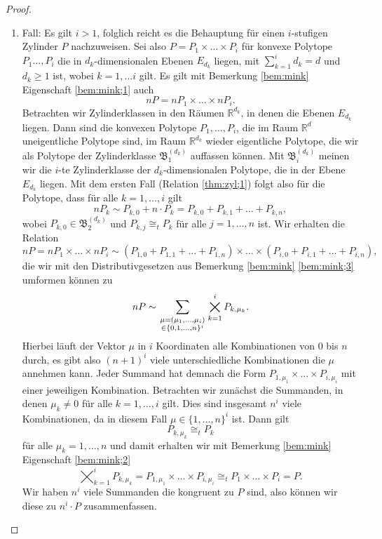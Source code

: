 \documentclass[11pt,titlepage]{article}
\newcommand{\setR}{\mathbb{R}}
\theoremstyle{definition}
\theoremstyle{remark}
\begin{document}
\begin{proof}
\begin{enumerate}
			\item Fall: Es gilt $i>1$, folglich reicht es die Behauptung für einen 
			$i$-stufigen Zylinder $P$ nachzuweisen. Sei also 
			$P=P_1\times\ldots \times P_i$ 
			für konvexe Polytope $P_1\ldots,P_i$ die in $d_k$-dimensionalen 
			Ebenen $E_{d_k}$ liegen, mit $\sum_{k=1}^i d_k =d$ und 
			$d_k\geq 1$ ist, wobei $k=1,\ldots i$ 
			gilt. Es gilt mit Bemerkung \ref{bem:mink} Eigenschaft  
			\ref{bem:mink;1} auch 
			\[nP=nP_1\times\ldots\times nP_i.\]
			Betrachten wir Zylinderklassen in den Räumen $\setR^{d_k}$, in denen 
			die Ebenen $E_{d_k}$ liegen. Dann sind die konvexen Polytope 
			$P_1,\ldots,P_i$, die im Raum $\setR^d$ uneigentliche Polytope sind, 
			im Raum $\setR^{d_k}$ wieder eigentliche Polytope, die 
			wir als Polytope der Zylinderklasse $\mathfrak{B}_1^{(d_k)}$ 
			auffassen können. Mit $\mathfrak{B}_i^{(d_k)}$ meinen wir  
			die $i$-te Zylinderklasse der $d_k$-dimensionalen Polytope, die in 
			der Ebene $E_{d_k}$ liegen. Mit dem ersten Fall (Relation 
			\ref{thm:zyl;1}) folgt also für 
			die Polytope, dass für alle $k=1,\ldots,i$ gilt
			\[nP_k\sim P_{k,0}+n\cdot P_k=P_{k,0}+P_{k,1}+\ldots+P_{k,n},\]
			wobei $P_{k,0}\in \mathfrak{B}_2^{(d_k)}$ und $P_{k,j}\cong_t P_k$ 
			für alle $j =1,\ldots,n$ ist. Wir erhalten die Relation 
			\[nP=nP_1\times\ldots\times nP_i \sim (P_{1,0}+P_{1,1}+\ldots+P_{1,n})
			\times\ldots\times (P_{i,0}+P_{i,1}+\ldots+P_{i,n}),\]
			die wir mit den Distributivgesetzen aus Bemerkung 
			\ref{bem:mink} \ref{bem:mink;3} 
			umformen können zu
			\[nP\sim \sum_{\genfrac{}{}{0pt}{1}{\mu=(\mu_1,\ldots,\mu_i)}{\in \{0,1,\ldots,n\}^i}}
			\bigtimes_{k=1}^i P_{k,\mu_k}.\]
			Hierbei läuft der Vektor $\mu$ in $i$ Koordinaten alle 
			Kombinationen von $0$ bis $n$ durch, es gibt also $(n+1)^i$ 
			viele unterschiedliche Kombinationen die $\mu$ annehmen kann. 
			Jeder Summand hat demnach die Form 
			$P_{1,\mu_1}\times\ldots\times P_{i,\mu_i}$ mit einer jeweiligen 
			Kombination. 
			Betrachten wir zunächst die Summanden, in denen $\mu_k\neq 0$ für alle 
			$k=1,\ldots,i$ gilt. Dies sind insgesamt $n^i$ viele Kombinationen, 
			da in diesem Fall $\mu\in\{1,\ldots,n\}^i$ ist. Dann gilt 
			\[P_{k,\mu_k}\cong_t P_k\]
			für alle $\mu_k=1,\ldots,n$ und damit erhalten wir mit 
			Bemerkung \ref{bem:mink} Eigenschaft \ref{bem:mink;2}
			\[\bigtimes_{k=1}^i P_{k,\mu_k}=
			P_{1,\mu_1}\times\ldots\times P_{i,\mu_i} \cong_t 
			P_1\times\ldots\times P_i =P.\]
			Wir haben $n^i$ viele Summanden die kongruent zu $P$ sind, 
			also 
			können wir diese zu $n^i \cdot P$ zusammenfassen. \\

\end{enumerate}
\end{proof}
\end{document}
